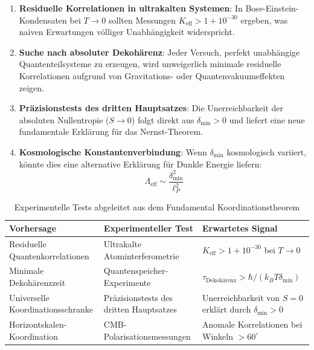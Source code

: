 \documentclass[11pt,a4paper]{article}
\begin{document}
	\begin{enumerate}
		\item \textbf{Residuelle Korrelationen in ultrakalten Systemen}: In Bose-Einstein-Kondensaten bei $T \to 0$ sollten Messungen $K_{\mathrm{eff}} > 1 + 10^{-30}$ ergeben, was naiven Erwartungen völliger Unabhängigkeit widerspricht.
		
		\item \textbf{Suche nach absoluter Dekohärenz}: Jeder Versuch, perfekt unabhängige Quantenteilsysteme zu erzeugen, wird unweigerlich minimale residuelle Korrelationen aufgrund von Gravitations- oder Quantenvakuumeffekten zeigen.
		
		\item \textbf{Präzisionstests des dritten Hauptsatzes}: Die Unerreichbarkeit der absoluten Nullentropie ($S \to 0$) folgt direkt aus $\delta_{\min} > 0$ und liefert eine neue fundamentale Erklärung für das Nernst-Theorem.
		
		\item \textbf{Kosmologische Konstantenverbindung}: Wenn $\delta_{\min}$ kosmologisch variiert, könnte dies eine alternative Erklärung für Dunkle Energie liefern:
		\begin{equation}
			\Lambda_{\mathrm{eff}} \sim \frac{\delta_{\min}^2}{\ell_P^2}
		\end{equation}
	\end{enumerate}
	
	\begin{table}[htbp]
		\centering
		\small
		\begin{tabular}{p{}p{}p{}}
			\toprule
			\textbf{Vorhersage} & \textbf{Experimenteller Test} & \textbf{Erwartetes Signal} \\
			\midrule
			Residuelle Quantenkorrelationen & Ultrakalte Atominterferometrie & $K_{\mathrm{eff}} > 1 + 10^{-30}$ bei $T \to 0$ \\
			Minimale Dekohärenzzeit & Quantenspeicher-Experimente & $\tau_{\text{Dekohärenz}} > \hbar/(k_B T \delta_{\min})$ \\
			Universelle Koordinationsschranke & Präzisionstests des dritten Hauptsatzes & Unerreichbarkeit von $S=0$ erklärt durch $\delta_{\min}>0$ \\
			Horizontskalen-Koordination & CMB-Polarisationsmessungen & Anomale Korrelationen bei Winkeln $>60^\circ$ \\
			\bottomrule
		\end{tabular}
		\caption{Experimentelle Tests abgeleitet aus dem Fundamental Koordinationstheorem}
		\label{tab:theorem-predictions}
	\end{table}
	
\end{document}
